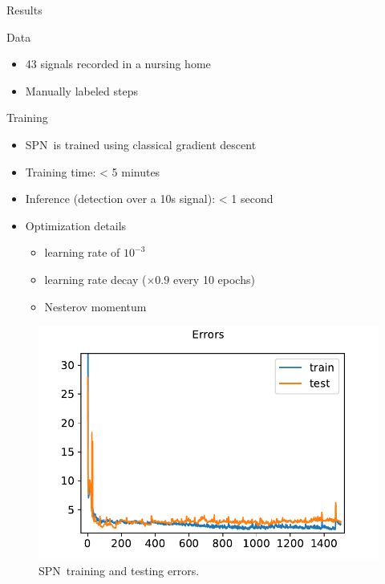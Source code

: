 \documentclass[8pt,t,aspectratio=1610]{beamer}
\newcommand{\subalgo}{{\small\textsc{SPN}}\ }
\begin{document}
\begin{frame}{Results}
\begin{minipage}[t]{0.45\linewidth}
    Data
    \begin{itemize}
        \item 43 signals recorded in a nursing home
        \item Manually labeled steps
    \end{itemize}
    Training
    \begin{itemize}
        \item \subalgo is trained using classical gradient descent
        \item Training time: < 5 minutes
        \item Inference (detection over a 10s signal): < 1 second
        \item Optimization details
        \begin{itemize}
            \item learning rate of $10^{-3}$
            \item learning rate decay ($\times 0.9$ every 10 epochs)
            \item Nesterov momentum
        \end{itemize}
    \end{itemize}
\end{minipage}\hfill
\begin{minipage}[t]{0.5\linewidth}
    \begin{figure}[h]
            \centering
            \includegraphics[width=\linewidth]{spn_train_test_errors.pdf}
        \caption{\subalgo training and testing errors.}
    \end{figure}
\end{minipage}
\end{frame}
\end{document}
